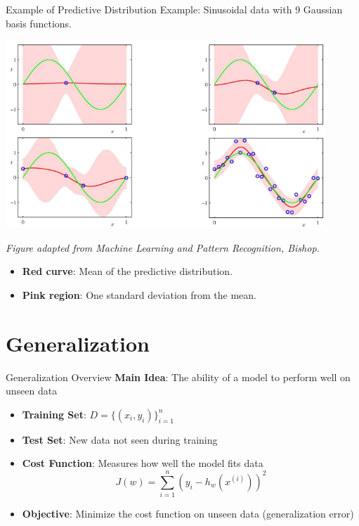 \documentclass[serif, aspectratio=169]{beamer}
\begin{document}
\begin{frame}{Example of Predictive Distribution}
\small Example: Sinusoidal data with 9 Gaussian basis functions.

\vspace{0.3cm}
\begin{minipage}{0.65\textwidth}
    \centering
    \includegraphics[width=0.9\textwidth]{pic/9.png}
    \caption*{\scriptsize \textit{Figure adapted from Machine Learning and Pattern Recognition, Bishop.}}
\end{minipage}%
\begin{minipage}{0.3\textwidth}
    \vspace{0.5cm} %
    \begin{itemize}
        \item \textbf{Red curve}: Mean of the predictive distribution.
        \item \textbf{Pink region}: One standard deviation from the mean.
    \end{itemize}
\end{minipage}
\end{frame}


\section{Generalization}
\begin{frame}{Generalization Overview}
    \textbf{Main Idea}: The ability of a model to perform well on unseen data
    \begin{itemize}
        \item \textbf{Training Set}: \( D = \{(x_i, y_i)\}_{i=1}^n \)
        \item \textbf{Test Set}: New data not seen during training
        \item \textbf{Cost Function}: Measures how well the model fits data
        \[
        J(w) = \sum_{i=1}^{n} (y_i - h_w(x^{(i)}))^2
        \]
        \item \textbf{Objective}: Minimize the cost function on unseen data (generalization error)
    \end{itemize}
\end{frame}
\end{document}
